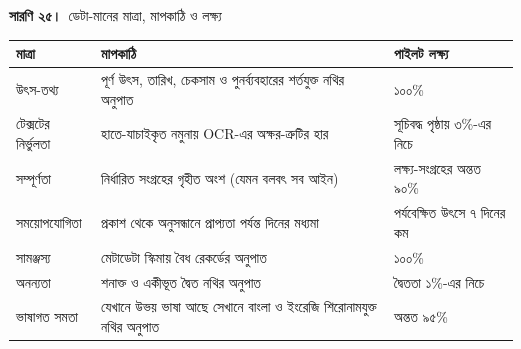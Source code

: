 \documentclass[border=10pt]{standalone}
\begin{document}
\begin{minipage}{17cm}
{\large\bfseries সারণি ২৫।}\ {\large ডেটা-মানের মাত্রা, মাপকাঠি ও লক্ষ্য}\par\vspace{7pt}
\small
{}
\begin{tabularx}{\linewidth}{@{}>{\hsize=0.652\hsize\raggedright\arraybackslash}X>{\hsize=1.478\hsize\raggedright\arraybackslash}X>{\hsize=0.870\hsize\raggedright\arraybackslash}X@{}}
\arrayrulecolor{bapilrule}\toprule
\rowcolor{white}\textbf{মাত্রা} & \textbf{মাপকাঠি} & \textbf{পাইলট লক্ষ্য} \\
\midrule
উৎস-তথ্য & পূর্ণ উৎস, তারিখ, চেকসাম ও পুনর্ব্যবহারের শর্তযুক্ত নথির অনুপাত & ১০০\% \\
টেক্সটের নির্ভুলতা & হাতে-যাচাইকৃত নমুনায় OCR-এর অক্ষর-ত্রুটির হার & সূচিবদ্ধ পৃষ্ঠায় ৩\%-এর নিচে \\
সম্পূর্ণতা & নির্ধারিত সংগ্রহের গৃহীত অংশ (যেমন বলবৎ সব আইন) & লক্ষ্য-সংগ্রহের অন্তত ৯০\% \\
সময়োপযোগিতা & প্রকাশ থেকে অনুসন্ধানে প্রাপ্যতা পর্যন্ত দিনের মধ্যমা & পর্যবেক্ষিত উৎসে ৭ দিনের কম \\
সামঞ্জস্য & মেটাডেটা স্কিমায় বৈধ রেকর্ডের অনুপাত & ১০০\% \\
অনন্যতা & শনাক্ত ও একীভূত দ্বৈত নথির অনুপাত & দ্বৈততা ১\%-এর নিচে \\
ভাষাগত সমতা & যেখানে উভয় ভাষা আছে সেখানে বাংলা ও ইংরেজি শিরোনামযুক্ত নথির অনুপাত & অন্তত ৯৫\% \\
\bottomrule
\end{tabularx}
\par\vspace{5pt}{\footnotesize\itshape পাইলট-লক্ষ্য। প্রতিটি কর্পাস রিলিজে কমপক্ষে ৫০ পৃষ্ঠার স্তরভিত্তিক নমুনায় দুজন যাচাইকারীর মাধ্যমে OCR-এর অক্ষর-ত্রুটির হার পরিমাপ করা হয়।}
\par{}
\end{minipage}
\end{document}
